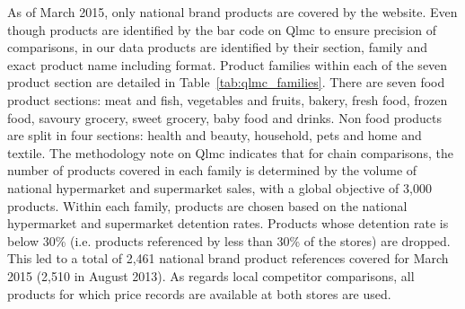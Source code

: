 \documentclass[english]{article}
\begin{document}
As of March 2015, only national brand products are covered by the website. Even though products are identified by the bar code on Qlmc to ensure precision of comparisons, in our data products are identified by their section, family and exact product name including format. Product families within each of the seven product section are detailed in Table~\ref{tab:qlmc_families}. There are seven food product sections: meat and fish, vegetables and fruits, bakery, fresh food, frozen food, savoury grocery, sweet grocery, baby food and drinks. Non food products are split in four sections: health and beauty, household, pets and home and textile. The methodology note on Qlmc indicates that for chain comparisons, the number of products covered in each family is determined by the volume of national hypermarket and supermarket sales, with a global objective of 3,000 products. Within each family, products are chosen based on the national hypermarket and supermarket detention rates. Products whose detention rate is below 30\% (i.e. products referenced by less than 30\% of the stores) are dropped. This led to a total of 2,461 national brand product references covered for March 2015 (2,510 in August 2013). As regards local competitor comparisons, all products for which price records are available at both stores are used.
\end{document}
